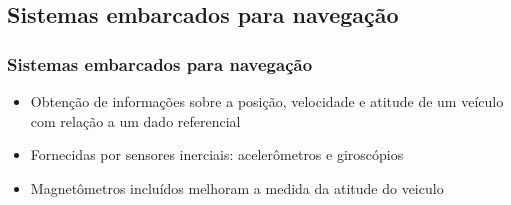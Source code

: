 \documentclass{beamer}
\begin{document}
\subsection{Sistemas embarcados para navegação}
\begin{frame}
	
	\frametitle{Sistemas embarcados para navegação}
	
	\begin{itemize}

	\item Obtenção de informações sobre a posição, velocidade e atitude de um veículo com relação a um dado referencial
	
	\vspace{1cm}
	
	\item Fornecidas por sensores inerciais: acelerômetros e giroscópios
	
	\vspace{1cm}
	
	\item Magnetômetros incluídos melhoram a medida da atitude do veiculo	
	
	\end{itemize}
	
\end{frame}	
\end{document}
